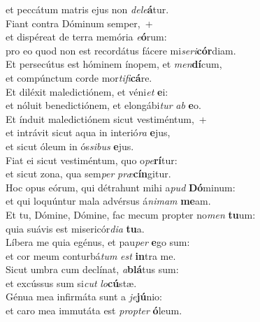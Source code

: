 \oddverse et peccátum matris ejus non \textit{de}\textit{le}\textbf{á}tur.\\
\evenverse Fiant contra Dóminum semper,~+\\
\evenverse  et dispéreat de terra memória \textit{e}\textbf{ó}rum:~\*\\
\evenverse pro eo quod non est recordátus fácere mi\textit{se}\textit{ri}\textbf{cór}diam.\\
\oddverse Et persecútus est hóminem ínopem, et \textit{men}\textbf{dí}cum,~\*\\
\oddverse et compúnctum corde mor\textit{ti}\textit{fi}\textbf{cá}re.\\
\evenverse Et diléxit maledictiónem, et véni\textit{et} \textbf{e}i:~\*\\
\evenverse et nóluit benedictiónem, et elongábi\textit{tur} \textit{ab} \textbf{e}o.\\
\oddverse Et índuit maledictiónem sicut vestiméntum,~+\\
\oddverse  et intrávit sicut aqua in interió\textit{ra} \textbf{e}jus,~\*\\
\oddverse et sicut óleum in ós\textit{si}\textit{bus} \textbf{e}jus.\\
\evenverse Fiat ei sicut vestiméntum, quo o\textit{pe}\textbf{rí}tur:~\*\\
\evenverse et sicut zona, qua sem\textit{per} \textit{præ}\textbf{cín}gitur.\\
\oddverse Hoc opus eórum, qui détrahunt mihi a\textit{pud} \textbf{Dó}minum:~\*\\
\oddverse et qui loquúntur mala advérsus á\textit{ni}\textit{mam} \textbf{me}am.\\
\evenverse Et tu, Dómine, Dómine, fac mecum propter no\textit{men} \textbf{tu}um:~\*\\
\evenverse quia suávis est misericór\textit{di}\textit{a} \textbf{tu}a.\\
\oddverse Líbera me quia egénus, et pau\textit{per} \textbf{e}go sum:~\*\\
\oddverse et cor meum conturbá\textit{tum} \textit{est} \textbf{in}tra me.\\
\evenverse Sicut umbra cum declínat, \textit{a}\textbf{blá}tus sum:~\*\\
\evenverse et excússus sum si\textit{cut} \textit{lo}\textbf{cú}stæ.\\
\oddverse Génua mea infirmáta sunt a \textit{je}\textbf{jú}nio:~\*\\
\oddverse et caro mea immutáta est \textit{prop}\textit{ter} \textbf{ó}leum.\\
